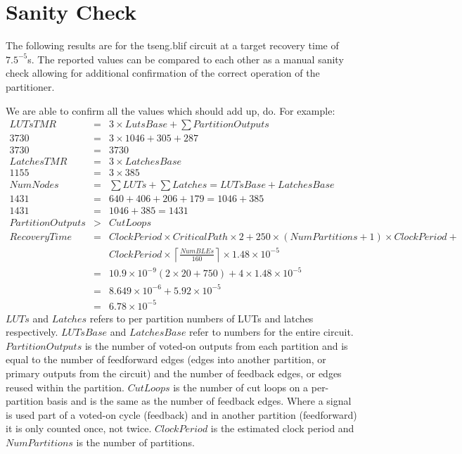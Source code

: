 \documentclass[12pt,final,oneside]{dwThesis} %
\begin{document}



   \section{Sanity Check}
   \label{resSanity} The following results are for the
   tseng.blif circuit at a target recovery time of $7.5^{-5}$s. The reported
   values can be compared to each other as a manual sanity check allowing for
   additional confirmation of the correct operation of the partitioner.

   We are able to confirm all the values which should add up, do. For example:
   \begin{eqnarray*}
      LUTsTMR &=& 3\times LutsBase + \sum PartitionOutputs\\
      3730 &=& 3\times1046 + 305 + 287\\
      3730 &=& 3730\\
      LatchesTMR &=&  3\times LatchesBase\\
      1155 &=& 3\times385\\
      NumNodes &=& \sum LUTs+\sum Latches = LUTsBase+LatchesBase \\
      1431 &=& 640+406+206+179 = 1046+385\\
      1431 &=& 1046 + 385 = 1431\\
      PartitionOutputs &>& CutLoops\\
      RecoveryTime &=&
      ClockPeriod\times CriticalPath\times 2 + 250\times(NumPartitions+1)\times
      ClockPeriod + \\
      & &ClockPeriod\times \left\lceil
      \frac{NumBLEs}{160}\right\rceil\times 1.48\times10^{-5}\\
      &=&
      10.9\times10^{-9}(2\times20+750)+4\times1.48\times10^{-5}\\
      &=&
      8.649\times10^{-6}+5.92\times10^{-5}\\
      &=& 6.78\times10^{-5}
   \end{eqnarray*}
   $LUTs$ and $Latches$ refers to per partition numbers of \glspl{LUT} and latches respectively. $LUTsBase$ and $LatchesBase$ refer to numbers for the entire circuit.
   $PartitionOutputs$ is the number of voted-on outputs from each partition and is equal to the number of feedforward edges (edges into another partition, or primary outputs from the circuit) and the number of feedback edges, or edges reused within the partition. $CutLoops$ is the number of cut loops on a per-partition basis and is the same as the number of feedback edges. Where a signal is used part of a voted-on cycle (feedback) and in another partition (feedforward) it is only counted once, not twice.
   $ClockPeriod$ is the estimated clock period and $NumPartitions$ is the number of partitions.
   
\end{document}

